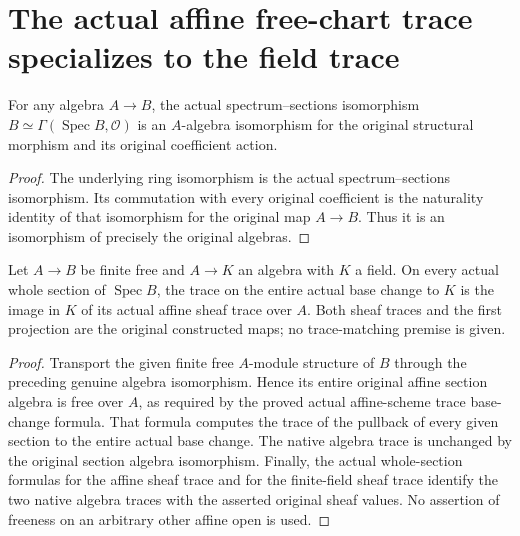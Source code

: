\section{The actual affine free-chart trace specializes to the field trace}

\begin{lemma}
\label{lem:kn-structure-trace-spec-section-algebra}
\leanok
For any algebra $A\to B$, the actual spectrum--sections isomorphism
$B\simeq\Gamma(\operatorname{Spec}B,\mathcal O)$ is an $A$-algebra
isomorphism for the original structural morphism and its original
coefficient action.
\end{lemma}
\begin{proof}
The underlying ring isomorphism is the actual spectrum--sections
isomorphism. Its commutation with every original coefficient is the
naturality identity of that isomorphism for the original map $A\to B$.
Thus it is an isomorphism of precisely the original algebras.
\end{proof}

\begin{lemma}
\label{lem:kn-structure-trace-affine-field-specialization}
\leanok
Let $A\to B$ be finite free and $A\to K$ an algebra with $K$ a field.
On every actual whole section of $\operatorname{Spec}B$, the trace on
the entire actual base change to $K$ is the image in $K$ of its actual
affine sheaf trace over $A$. Both sheaf traces and the first projection
are the original constructed maps; no trace-matching premise is given.
\end{lemma}
\begin{proof}
Transport the given finite free $A$-module structure of $B$ through the
preceding genuine algebra isomorphism. Hence its entire original affine
section algebra is free over $A$, as required by the proved actual
affine-scheme trace base-change formula. That formula computes the trace
of the pullback of every given section to the entire actual base change.
The native algebra trace is unchanged by the original section algebra
isomorphism. Finally, the actual whole-section formulas for the affine
sheaf trace and for the finite-field sheaf trace identify the two native
algebra traces with the asserted original sheaf values. No assertion of
freeness on an arbitrary other affine open is used.
\end{proof}
